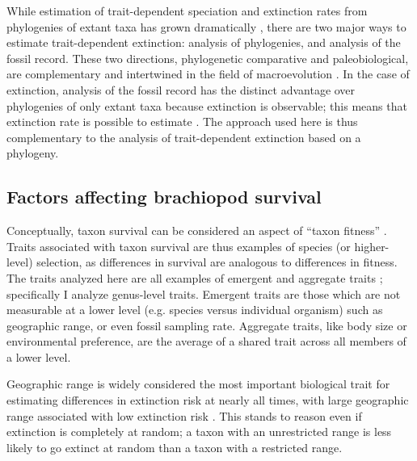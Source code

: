 \documentclass[11pt]{article}
\begin{document}
While estimation of trait-dependent speciation and extinction rates from phylogenies of extant taxa has grown dramatically \citep{Maddison2007,Fitzjohn2010,Goldberg2011a,Goldberg2005,Rabosky2013,Stadler2013b,Stadler2011a,Stadler2013a}, there are two major ways to estimate trait-dependent extinction: analysis of phylogenies, and analysis of the fossil record. These two directions, phylogenetic comparative and paleobiological, are complementary and intertwined in the field of macroevolution \citep{Rabosky2010b,Jablonski2008a,Hunt2014a}. In the case of extinction, analysis of the fossil record has the distinct advantage over phylogenies of only extant taxa because extinction is observable; this means that extinction rate is possible to estimate \citep{Rabosky2010a,Quental2009,Liow2010a}. The approach used here is thus complementary to the analysis of trait-dependent extinction based on a phylogeny.


\subsection*{Factors affecting brachiopod survival}

Conceptually, taxon survival can be considered an aspect of ``taxon fitness'' \citep{Cooper1984,Palmer2012}. Traits associated with taxon survival are thus examples of species (or higher-level) selection, as differences in survival are analogous to differences in fitness. The traits analyzed here are all examples of emergent and aggregate traits \citep{Jablonski2008a,Rabosky2010b}; specifically I analyze genus-level traits. Emergent traits are those which are not measurable at a lower level (e.g. species versus individual organism) such as geographic range, or even fossil sampling rate. Aggregate traits, like body size or environmental preference, are the average of a shared trait across all members of a lower level.

Geographic range is widely considered the most important biological trait for estimating differences in extinction risk at nearly all times, with large geographic range associated with low extinction risk \citep{Jablonski1986,Jablonski1987,Jablonski2003,Payne2007,Jablonski2008a,Harnik2013,Finnegan2012a}. This stands to reason even if extinction is completely at random; a taxon with an unrestricted range is less likely to go extinct at random than a taxon with a restricted range.
\end{document}
